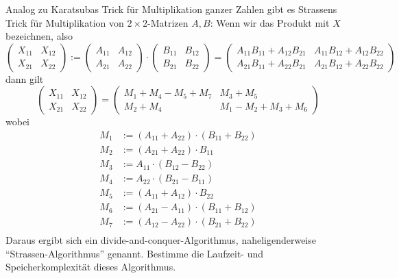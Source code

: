 \begin{sheet}
    \begin{problem}[title={Strassens Matrixmultiplikationsalgorithmus}]
        Analog zu Karatsubas Trick für Multiplikation ganzer Zahlen gibt es Strassens Trick für Multiplikation von $2\times 2$-Matrizen $A,B$: Wenn wir das Produkt mit $X$ bezeichnen, also
        \[ \begin{pmatrix}
               X_{11} & X_{12} \\ X_{21} & X_{22}
        \end{pmatrix} :=
        \begin{pmatrix}
            A_{11} & A_{12} \\ A_{21} & A_{22}
        \end{pmatrix} \cdot
        \begin{pmatrix}
            B_{11} & B_{12} \\ B_{21} & B_{22}
        \end{pmatrix} = \begin{pmatrix}
                            A_{11} B_{11}+ A_{12} B_{21}  & A_{11} B_{12} + A_{12} B_{22} \\
                            A_{21} B_{11} + A_{22} B_{21} & A_{21} B_{12} +A_{22} B_{22}
        \end{pmatrix}\]
        dann gilt
        \[\begin{pmatrix}
              X_{11} & X_{12} \\ X_{21} & X_{22}
        \end{pmatrix} =
        \begin{pmatrix}
            M_1 + M_4 - M_5 + M_7 & M_3 + M_5             \\
            M_2 + M_4             & M_1 - M_2 + M_3 + M_6
        \end{pmatrix}\]
        wobei
        \begin{align*}
            M_1 &:= (A_{11} + A_{22}) \cdot (B_{11} + B_{22}) \\
            M_2 &:= (A_{21} + A_{22}) \cdot B_{11} \\
            M_3 &:= A_{11} \cdot (B_{12} - B_{22}) \\
            M_4 &:= A_{22} \cdot (B_{21} - B_{11}) \\
            M_5 &:= (A_{11} + A_{12}) \cdot B_{22} \\
            M_6 &:= (A_{21} - A_{11}) \cdot (B_{11} + B_{12}) \\
            M_7 &:= (A_{12} - A_{22}) \cdot (B_{21} + B_{22}) \\
        \end{align*}
        Daraus ergibt sich ein divide-and-conquer-Algorithmus, naheligenderweise \enquote{Strassen-Algorithmus} genannt. Bestimme die Laufzeit- und Speicherkomplexität dieses Algorithmus.
    \end{problem}


\end{sheet}
